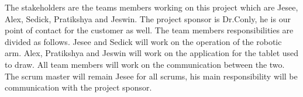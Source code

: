 The stakeholders are the teams members working on this project which are Jesee, Alex, Sedick, Pratikshya and Jeswin. The project sponsor is Dr.Conly, he is our point of contact for the customer as well.  The team members responsibilities are divided as follows. Jesee and Sedick will work on the operation of the robotic arm. Alex, Pratikshya and Jeswin will work on the application for the tablet used to draw. All team members will work on the communication between the two. The scrum master will remain Jesee for all scrums, his main responsibility will be communication with the project sponsor.

